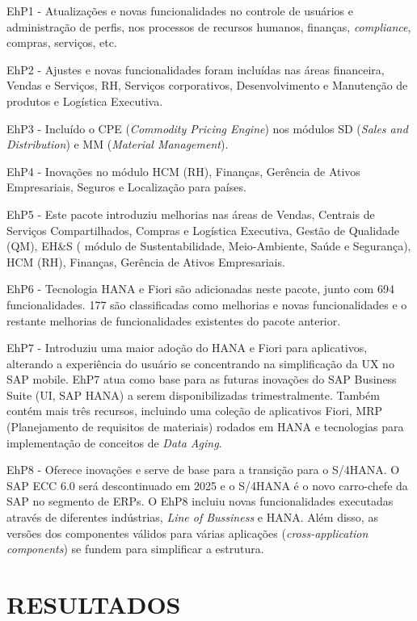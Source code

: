 EhP1 - Atualizações e novas funcionalidades no controle de usuários e administração de perfis, nos processos de recursos humanos, finanças, \textit{compliance}, compras, serviços, etc.

EhP2 - Ajustes e novas funcionalidades foram incluídas nas áreas financeira, Vendas e Serviços, RH, Serviços corporativos, Desenvolvimento e Manutenção de produtos e Logística Executiva.

EhP3 - Incluído o CPE (\textit{Commodity Pricing Engine}) nos módulos SD (\textit{Sales and Distribution}) e MM (\textit{Material Management}).

EhP4 - Inovações no módulo HCM (RH), Finanças, Gerência de Ativos Empresariais, Seguros e Localização para países.

EhP5 - Este pacote introduziu melhorias nas áreas de Vendas, Centrais de Serviços Compartilhados, Compras e Logística Executiva, Gestão de Qualidade (QM), EH\&S ( módulo de Sustentabilidade, Meio-Ambiente, Saúde e Segurança), HCM (RH), Finanças, Gerência de Ativos Empresariais.

EhP6 - Tecnologia HANA e Fiori são adicionadas neste pacote,  junto com 694 funcionalidades. 177 são classificadas como melhorias e novas funcionalidades e o restante melhorias de funcionalidades existentes do pacote anterior.

EhP7 - Introduziu uma maior adoção do HANA e Fiori para aplicativos, alterando a experiência do usuário se concentrando na simplificação da UX no SAP mobile. EhP7 atua como base para as futuras inovações do SAP Business Suite (UI, SAP HANA) a serem disponibilizadas trimestralmente. Também contém mais três recursos, incluindo uma coleção de aplicativos Fiori, MRP (Planejamento de requisitos de materiais) rodados em HANA e tecnologias para implementação de conceitos de \textit{Data Aging}.

EhP8 - Oferece inovações e serve de base para a transição para o S/4HANA. O SAP ECC 6.0 será descontinuado em 2025 e o S/4HANA é o novo carro-chefe da SAP no segmento de ERPs. O EhP8 incluiu novas funcionalidades executadas através de diferentes indústrias, \textit{Line of Bussiness} e HANA. Além disso, as versões dos componentes válidos para várias aplicações (\textit{cross-application components})  se fundem para simplificar a estrutura.

\section{\esp RESULTADOS}

